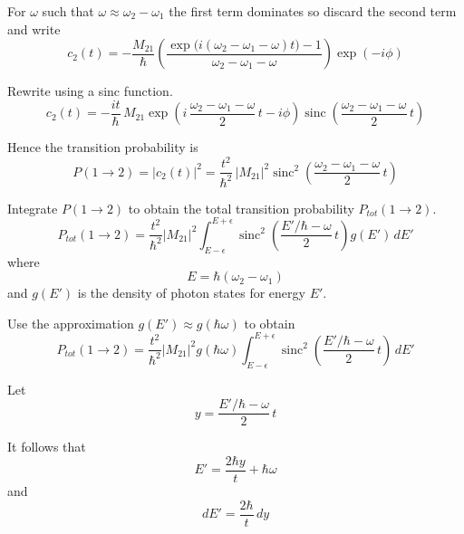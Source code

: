 \documentclass[12pt]{article}
\begin{document}
For $\omega$ such that $\omega\approx\omega_2-\omega_1$ the first term
dominates so discard the second term and write
\begin{equation*}
c_2(t)=-\frac{M_{21}}{\hbar}
\left(
\frac{\exp\bigl(i(\omega_2-\omega_1-\omega) t\bigr)-1}{\omega_2-\omega_1-\omega}
\right)\exp(-i\phi)
\end{equation*}

Rewrite using a sinc function.
\begin{equation*}
c_2(t)=-\frac{it}{\hbar}\,M_{21}
\exp\left(i\,\frac{\omega_2-\omega_1-\omega}{2}\,t-i\phi\right)
\operatorname{sinc}\left(\frac{\omega_2-\omega_1-\omega}{2}\,t\right)
\tag{2}
\end{equation*}

Hence the transition probability is
\begin{equation*}
P(1\rightarrow2)=|c_2(t)|^2=\frac{t^2}{\hbar^2}\,|M_{21}|^2
\operatorname{sinc}^2\left(\frac{\omega_2-\omega_1-\omega}{2}\,t\right)
\tag{3}
\end{equation*}

Integrate $P(1\rightarrow2)$ to obtain the total transition probability
$P_{tot}(1\rightarrow2)$.
\begin{equation*}
P_{tot}(1\rightarrow2)=\frac{t^2}{\hbar^2}|M_{21}|^2
\int_{E-\epsilon}^{E+\epsilon}
\operatorname{sinc}^2\left(\frac{E'/\hbar-\omega}{2}\,t\right)
g(E')\,dE'
\end{equation*}
%
where
\begin{equation*}
E=\hbar(\omega_2-\omega_1)
\end{equation*}
%
and $g(E')$ is the density of photon states for energy $E'$.

\bigskip

Use the approximation $g(E')\approx g(\hbar\omega)$ to obtain
\begin{equation*}
P_{tot}(1\rightarrow2)=\frac{t^2}{\hbar^2}|M_{21}|^2g(\hbar\omega)
\int_{E-\epsilon}^{E+\epsilon}
\operatorname{sinc}^2\left(\frac{E'/\hbar-\omega}{2}\,t\right)\,dE'
\end{equation*}

Let
\begin{equation*}
y=\frac{E'/\hbar-\omega}{2}\,t
\end{equation*}

It follows that
\begin{equation*}
E'=\frac{2\hbar y}{t}+\hbar\omega
\end{equation*}
%
and
\begin{equation*}
dE'=\frac{2\hbar}{t}\,dy
\end{equation*}
\end{document}
